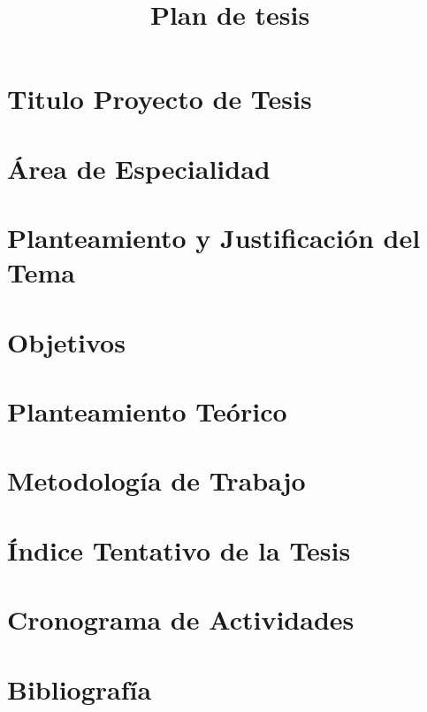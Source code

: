 \documentclass[a4paper,11pt]{report}
\title{Plan de tesis}
\begin{document}
 
 \maketitle
 
 \section{Titulo Proyecto de Tesis}

 \section{Área de Especialidad}
 
 \section{Planteamiento y Justificación del Tema}
  \lipsum[1]
  
 \section{Objetivos}
  \lipsum[1]
  
 \section{Planteamiento Teórico}
  \lipsum[1]
  
 \section{Metodología de Trabajo}
  \lipsum[1]
  
 \section{Índice Tentativo de la Tesis}
  \lipsum[1]
  
 \section{Cronograma de Actividades}
  \lipsum[1]
  
 \section{Bibliografía}
 
 
\end{document}

